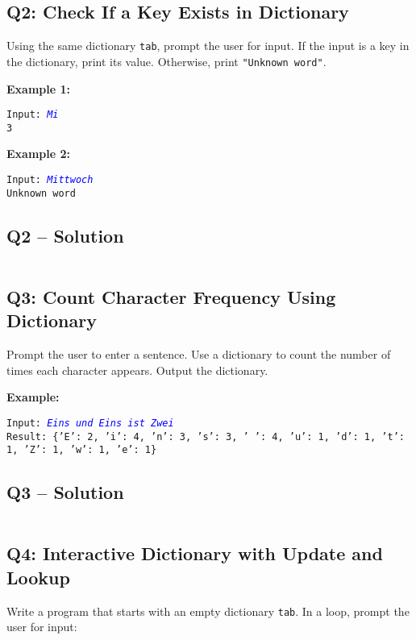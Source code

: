 \documentclass[a4paper,11pt]{article}
\begin{document}
	\subsection*{Q2: Check If a Key Exists in Dictionary}
	Using the same dictionary \texttt{tab}, prompt the user for input. If the input is a key in the dictionary, print its value. Otherwise, print \texttt{"Unknown word"}.
	
	\textbf{Example 1:}
	\begin{flushleft}
		\texttt{Input: \textcolor{blue}{\textit{Mi}}}\\
		\texttt{3}
	\end{flushleft}
	
	\textbf{Example 2:}
	\begin{flushleft}
		\texttt{Input: \textcolor{blue}{\textit{Mittwoch}}}\\
		\texttt{Unknown word}
	\end{flushleft}
	
	
	\subsection*{Q2 – Solution}
	\inputminted{python}{Files/8/2.py}
	
	\subsection*{Q3: Count Character Frequency Using Dictionary}
	Prompt the user to enter a sentence. Use a dictionary to count the number of times each character appears. Output the dictionary.
	
	\textbf{Example:}
	\begin{flushleft}
		\texttt{Input: \textcolor{blue}{\textit{Eins und Eins ist Zwei}}}\\
		\texttt{Result: \{'E': 2, 'i': 4, 'n': 3, 's': 3, ' ': 4, 'u': 1, 'd': 1, 't': 1, 'Z': 1, 'w': 1, 'e': 1\}}
	\end{flushleft}
	
	\subsection*{Q3 – Solution}
	\inputminted{python}{Files/8/3.py}
	
	\subsection*{Q4: Interactive Dictionary with Update and Lookup}
	Write a program that starts with an empty dictionary \texttt{tab}. In a loop, prompt the user for input:
	
\end{document}
